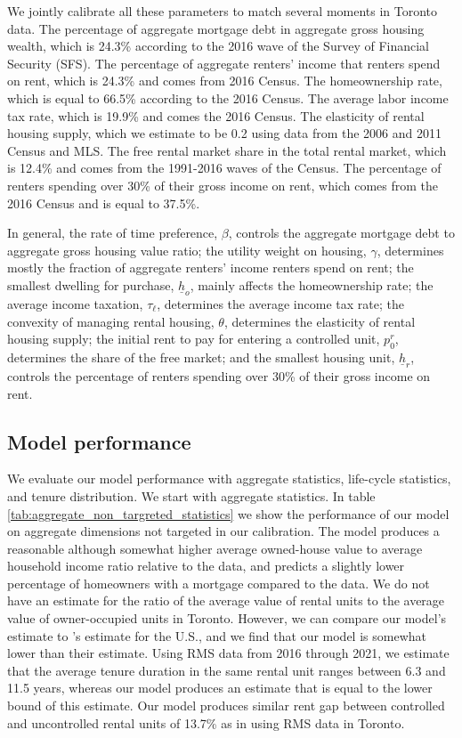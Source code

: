 \documentclass[parskip=full]{article}
\begin{document}
We jointly calibrate all these parameters to match several moments in Toronto data. The percentage of aggregate mortgage debt in aggregate gross housing wealth, which is 24.3\% according to the 2016 wave of the Survey of Financial Security (SFS). The percentage of aggregate renters' income that renters spend on rent, which is 24.3\% and comes from 2016 Census. The homeownership rate, which is equal to 66.5\% according to the 2016 Census. The average labor income tax rate, which is 19.9\% and comes the 2016 Census. The elasticity of rental housing supply, which we estimate to be 0.2 using data from the 2006 and 2011 Census and MLS. The free rental market share in the total rental market, which is 12.4\% and comes from the 1991-2016 waves of the Census. The percentage of renters spending over 30\% of their gross income on rent, which comes from the 2016 Census and is equal to 37.5\%.

In general, the rate of time preference, $\beta$, controls the aggregate mortgage debt to aggregate gross housing value ratio; the utility weight on housing, $\gamma$, determines mostly the fraction of aggregate renters' income renters spend on rent; the smallest dwelling for purchase, $\underline{h}_{o}$, mainly affects the homeownership rate; the average income taxation, $\tau_{\ell}$, determines the average income tax rate; the convexity of managing rental housing, $\theta$, determines the elasticity of rental housing supply; the initial rent to pay for entering a controlled unit, $p^{r}_{0}$, determines the share of the free market; and the smallest housing unit, $\underline{h}_{r}$, controls the percentage of renters spending over 30\% of their gross income on rent.

\subsection{Model performance}\label{subsection:non_targeted_statistics}

We evaluate our model performance with aggregate statistics, life-cycle statistics, and tenure distribution. We start with aggregate statistics. In table \ref{tab:aggregate_non_targreted_statistics} we show the performance of our model on aggregate dimensions not targeted in our calibration. The model produces a reasonable although somewhat higher average owned-house value to average household income ratio relative to the data, and predicts a slightly lower percentage of homeowners with a mortgage compared to the data. We do not have an estimate for the ratio of the average value of rental units to the average value of owner-occupied units in Toronto. However, we can compare our model's estimate to \citet{chatterjee-eyigungor-2015}'s estimate for the U.S., and we find that our model is somewhat lower than their estimate. Using RMS data from 2016 through 2021, we estimate that the average tenure duration in the same rental unit ranges between 6.3 and 11.5 years, whereas our model produces an estimate that is equal to the lower bound of this estimate. Our model produces similar rent gap between controlled and uncontrolled rental units of 13.7\% as in \citet{zhang-gou} using RMS data in Toronto.
\end{document}
